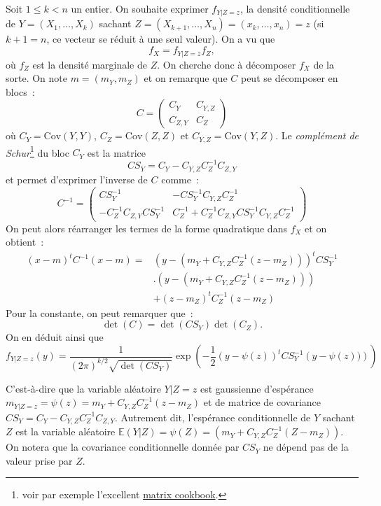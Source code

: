 Soit \(1 \leq k < n\) un entier. On souhaite exprimer \(f_{Y|Z=z}\), la
densité conditionnelle de \(Y = (X_1,\ldots,X_k)\) sachant
\(Z = (X_{k+1},\ldots,X_n) = (x_k,\ldots,x_n) = z\) (si \(k+1 = n\), ce
vecteur se réduit à une seul valeur). On a vu que
\[f_X = f_{Y|Z=z} f_Z,\] où \(f_Z\) est la densité marginale de \(Z\).
On cherche donc à décomposer \(f_X\) de la sorte. On note
\(m = (m_Y,m_Z)\) et on remarque que \(C\) peut se décomposer en blocs~:
\begin{equation*}
C = \left(\begin{array}{cc} C_Y & C_{Y,Z} \\ C_{Z,Y} & C_Z \end{array}\right)
\end{equation*} où \(C_Y = \text{Cov}(Y,Y)\), \(C_Z = \text{Cov}(Z,Z)\)
et \(C_{Y,Z} = \text{Cov}(Y,Z)\). Le \emph{complément de
Schur}\footnote{voir par exemple l'excellent
  \href{https://www2.compute.dtu.dk/pubdb/edoc/imm3274.pdf}{matrix
  cookbook}.} du bloc \(C_Y\) est la matrice
\[CS_Y = C_Y - C_{Y,Z}C_Z^{-1}C_{Z,Y}\] et permet d'exprimer l'inverse
de \(C\) comme~: \begin{equation*}
C^{-1} = \left(\begin{array}{cc} CS_Y^{-1} & -CS_Y^{-1}C_{Y,Z}C_Z^{-1} \\ -C_Z^{-1}C_{Z,Y}CS_Y^{-1}  & C_Z^{-1} + C_Z^{-1}C_{Z,Y}CS_Y^{-1}C_{Y,Z}C_Z^{-1} \end{array}\right)
\end{equation*} On peut alors réarranger les termes de la forme
quadratique dans \(f_X\) et on obtient~: \begin{align*}
(x-m)^t C^{-1}(x-m) =& \left(y - (m_Y + C_{Y,Z}C_Z^{-1}(z-m_Z))\right)^t CS_Y^{-1}\\
&.\left(y - (m_Y + C_{Y,Z}C_Z^{-1}(z-m_Z))\right)\\
 &+ (z-m_Z)^t C_Z^{-1}(z-m_Z)
\end{align*} Pour la constante, on peut remarquer que~:
\[ \det (C) = \det(CS_Y)\det(C_Z).\] On en déduit ainsi que
\[f_{Y|Z=z}(y) = \frac{1}{(2\pi)^{k/2}\sqrt{\det (CS_Y)}}\exp \left(-\frac{1}{2}\left(y - \psi(z)\right)^t CS_Y^{-1}\left(y - \psi(z))\right)\right)\]

C'est-à-dire que la variable aléatoire \(Y|Z=z\) est gaussienne
d'espérance \(m_{Y|Z=z} = \psi(z) = m_Y + C_{Y,Z}C_Z^{-1}(z-m_Z)\) et de
matrice de covariance \(CS_Y = C_Y - C_{Y,Z}C_Z^{-1}C_{Z,Y}\). Autrement
dit, l'espérance conditionnelle de \(Y\) sachant \(Z\) est la variable
aléatoire \(\mathbb{E}(Y|Z) = \psi(Z) =(m_Y + C_{Y,Z}C_Z^{-1}(Z-m_Z))\).
On notera que la covariance conditionnelle donnée par \(CS_Y\) ne dépend
pas de la valeur prise par \(Z\).

